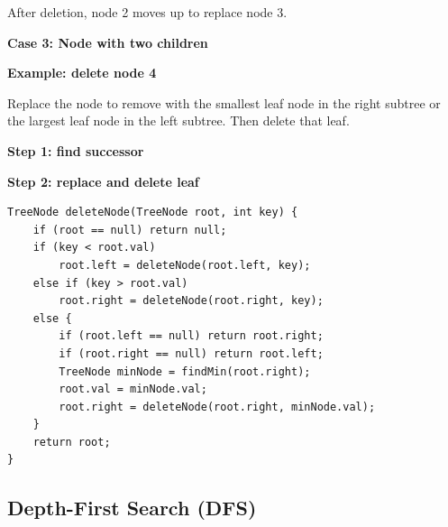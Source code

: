 After deletion, node 2 moves up to replace node 3.

\bigskip

\textbf{Case 3: Node with two children}  

\textbf{Example: delete node 4}

Replace the node to remove with the smallest leaf node in the right subtree or the largest leaf node in the left subtree. Then delete that leaf.


\textbf{Step 1: find successor}

\begin{center}
\end{center}

\textbf{Step 2: replace and delete leaf}

\begin{center}
\end{center}

\begin{verbatim}
TreeNode deleteNode(TreeNode root, int key) {
    if (root == null) return null;
    if (key < root.val)
        root.left = deleteNode(root.left, key);
    else if (key > root.val)
        root.right = deleteNode(root.right, key);
    else {
        if (root.left == null) return root.right;
        if (root.right == null) return root.left;
        TreeNode minNode = findMin(root.right);
        root.val = minNode.val;
        root.right = deleteNode(root.right, minNode.val);
    }
    return root;
}
\end{verbatim}


\subsection{Depth-First Search (DFS)}

